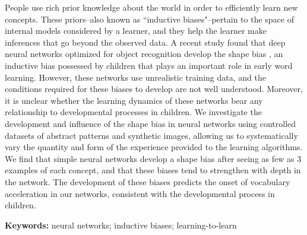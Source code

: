People use rich prior knowledge about the world in order to efficiently learn
new concepts. These priors--also known as ``inductive biases"--pertain to the
space of internal models considered by a learner, and they help the learner
make inferences that go beyond the observed data. A recent study found that
deep neural networks optimized for object recognition develop the shape bias
\citep{Ritter2017}, an inductive bias possessed by children that plays an
important role in early word learning. However, these networks use unrealistic
training data, and the conditions required for these biases to develop are not
well understood. Moreover, it is unclear whether the learning dynamics of these
networks bear any relationship to developmental processes in children. We
investigate the development and influence of the shape bias in neural networks
using controlled datasets of abstract patterns and synthetic images, allowing
us to systematically vary the quantity and form of the experience provided to
the learning algorithms. We find that simple neural networks develop a shape
bias after seeing as few as 3 examples of each concept, and that these biases
tend to strengthen with depth in the network. The development of these biases
predicts the onset of vocabulary acceleration in our networks, consistent with
the developmental process in children.

\textbf{Keywords:}
neural networks; inductive biases; learning-to-learn